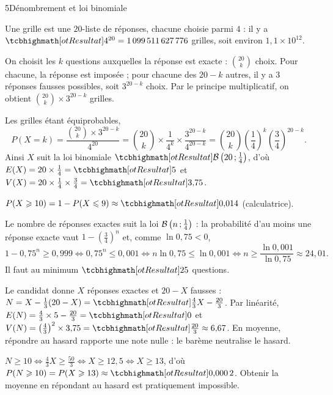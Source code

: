 

\begin{corrigeBac}{5}{Dénombrement et loi binomiale}
\begin{questions}
  \item Une grille est une $20$-liste de réponses, chacune choisie parmi $4$ : il y a $\res{4^{20}}=1\,099\,511\,627\,776$ grilles,
    soit environ $1{,}1\times10^{12}$. 
  \item On choisit les $k$ questions auxquelles la réponse est exacte : $\binom{20}{k}$ choix. Pour chacune, la réponse est imposée ; pour
    chacune des $20-k$ autres, il y a $3$ réponses fausses possibles, soit $3^{20-k}$ choix. Par le principe multiplicatif, on obtient
    $\binom{20}{k}\times3^{20-k}$ grilles. 
\end{questions}
\begin{questions}[resume]
  \item Les grilles étant équiprobables,
    \[P(X=k)=\frac{\binom{20}{k}\times3^{20-k}}{4^{20}}=\binom{20}{k}\times\frac{1}{4^{k}}\times\frac{3^{20-k}}{4^{20-k}}
      =\binom{20}{k}\left(\frac14\right)^{k}\left(\frac34\right)^{20-k}.\]
    Ainsi $X$ suit la loi binomiale $\res{\mathcal{B}\left(20\pv\tfrac14\right)}$, d'où $E(X)=20\times\frac14=\res{5}$ et
    $V(X)=20\times\frac14\times\frac34=\res{3{,}75}$. \pts{1 pt}
  \item $P(X\geq10)=1-P(X\leq9)\approx\res{0{,}014}$ (calculatrice). 
  \item Le nombre de réponses exactes suit la loi $\mathcal{B}\left(n\,{;}\,\frac14\right)$ : la probabilité d'au moins une réponse exacte
    vaut $1-\left(\frac34\right)^{n}$ et, comme $\ln0{,}75<0$,
    \[1-0{,}75^{n}\geq0{,}999\iff0{,}75^{n}\leq0{,}001\iff n\ln0{,}75\leq\ln0{,}001\iff n\geq\frac{\ln0{,}001}{\ln0{,}75}\approx24{,}01.\]
    Il faut au minimum $\res{25}$ questions. 
\end{questions}
\begin{questions}[resume]
  \item Le candidat donne $X$ réponses exactes et $20-X$ fausses : $N=X-\frac13(20-X)=\res{\tfrac43X-\tfrac{20}3}$. Par linéarité,
    $E(N)=\frac43\times5-\frac{20}3=\res{0}$ et $V(N)=\left(\frac43\right)^{2}\times3{,}75=\res{\tfrac{20}3}\approx6{,}67$. En moyenne,
    répondre au hasard rapporte une note nulle : le barème neutralise le hasard. \pts{1 pt}
  \item $N\geq10\iff\frac43X\geq\frac{50}3\iff X\geq12{,}5\iff X\geq13$, d'où $P(N\geq10)=P(X\geq13)\approx\res{0{,}000\,2}$.
    Obtenir la moyenne en répondant au hasard est pratiquement impossible. 
\end{questions}
\end{corrigeBac}

